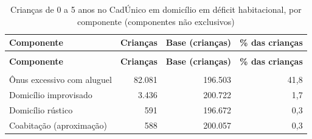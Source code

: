 \begin{apendicesenv}
{\small\setlength{\tabcolsep}{5pt}
\begin{longtable}{@{}>{\raggedright\arraybackslash}p{3.6cm}rrr@{}}
\caption{Crianças de 0 a 5 anos no CadÚnico em domicílio em déficit habitacional, por componente (componentes não exclusivos)}\label{tab:cadunico-deficit-componentes-0-a-5-2026}\\
\toprule \textbf{Componente} & \textbf{Crianças} & \parbox[b]{2.20cm}{\raggedleft{} \textbf{Base (crianças)}} & \parbox[b]{2.20cm}{\raggedleft{} \textbf{\% das crianças}} \\ \midrule \endfirsthead
{}\\ \toprule \textbf{Componente} & \textbf{Crianças} & \parbox[b]{2.20cm}{\raggedleft{} \textbf{Base (crianças)}} & \parbox[b]{2.20cm}{\raggedleft{} \textbf{\% das crianças}} \\ \midrule \endhead
\midrule {}\\ \endfoot
\bottomrule \endlastfoot
Ônus excessivo com aluguel & 82.081 & 196.503 & 41,8 \\
Domicílio improvisado & 3.436 & 200.722 & 1,7 \\
Domicílio rústico & 591 & 196.672 & 0,3 \\
Coabitação (aproximação) & 588 & 200.057 & 0,3 \\
\end{longtable}}
\vspace{-6pt}


\end{apendicesenv}
